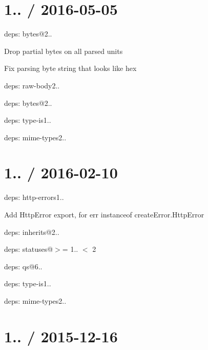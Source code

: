 \section*{1.. / 2016-\/05-\/05 }


\begin{DoxyItemize}
\item deps\+: bytes@2..
\begin{DoxyItemize}
\item Drop partial bytes on all parsed units
\item Fix parsing byte string that looks like hex
\end{DoxyItemize}
\item deps\+: raw-\/body2..
\begin{DoxyItemize}
\item deps\+: bytes@2..
\end{DoxyItemize}
\item deps\+: type-\/is1..
\begin{DoxyItemize}
\item deps\+: mime-\/types2..
\end{DoxyItemize}
\end{DoxyItemize}

\section*{1.. / 2016-\/02-\/10 }


\begin{DoxyItemize}
\item deps\+: http-\/errors1..
\begin{DoxyItemize}
\item Add {\ttfamily Http\+Error} export, for {\ttfamily err instanceof create\+Error.\+Http\+Error}
\item deps\+: inherits@2..
\item deps\+: statuses@\textquotesingle{}$>$= 1.. $<$ 2\textquotesingle{}
\end{DoxyItemize}
\item deps\+: qs@6..
\item deps\+: type-\/is1..
\begin{DoxyItemize}
\item deps\+: mime-\/types2..
\end{DoxyItemize}
\end{DoxyItemize}

\section*{1.. / 2015-\/12-\/16 }


